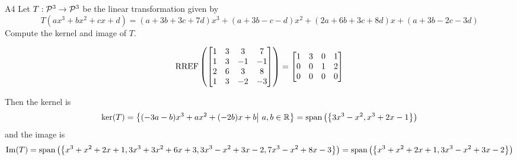 \begin{problem}{A4}
Let $T: \P^3 \rightarrow \P^3$ be the linear transformation given by $$T\left( ax^3+bx^2+cx+d \right)  = (a+3b+3c+7d)x^3 + (a+3b-c-d)x^2+  (2a+6b+3c+8d)x+  (a+3b-2c-3d)$$
Compute the kernel and image of $T$.
\end{problem}
\begin{solution}

$$\RREF\left(\begin{bmatrix} 1 & 3 & 3 & 7 \\ 1 & 3 & -1 & -1 \\ 2 & 6 & 3 & 8 \\ 1 & 3 & -2 & -3 \end{bmatrix}\right) = \begin{bmatrix} 1 & 3 & 0 & 1 \\ 0 & 0 & 1 & 2 \\ 0 & 0 & 0 & 0 \end{bmatrix}$$

Then the kernel is
$$\ker(T) = \left\{ (-3a-b)x^3+  ax^2+ (-2b)x+  b  \big|\ a,b \in \IR\right\} = {\rm span}\left(\left\{ 3x^3 -x^2 , x^3+2x-1 \right\} \right)$$
and the image is 
$${\rm Im}(T) = {\rm span} \left( \left\{ x^3+x^2+2x+1, 3x^3+3x^2+6x+3, 3x^3-x^2+3x-2, 7x^3-x^2+8x-3\right\} \right) = {\rm span} \left( \left\{ x^3+x^2+2x+1, 3x^3-x^2+3x-2\right\} \right)$$
\end{solution}



